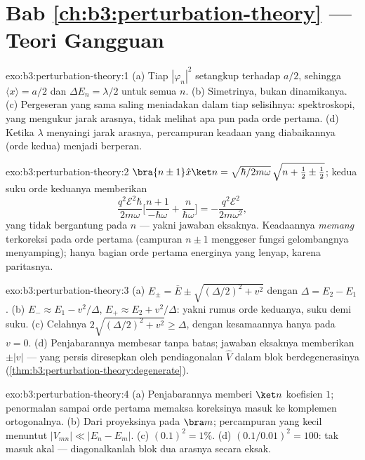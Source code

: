 \section*{Bab \ref{ch:b3:perturbation-theory} --- Teori Gangguan}

\begin{solution}{exo:b3:perturbation-theory:1}
(a) Tiap $|\varphi_n|^2$ setangkup terhadap $a/2$, sehingga $\langle
x\rangle = a/2$ dan $\Delta E_n = \lambda/2$ untuk semua $n$. (b)
Simetrinya, bukan dinamikanya. (c) Pergeseran yang sama saling
meniadakan dalam tiap selisihnya: spektroskopi, yang mengukur jarak
arasnya, tidak melihat apa pun pada orde pertama. (d) Ketika $\lambda$
menyaingi jarak arasnya, percampuran keadaan yang diabaikannya (orde
kedua) menjadi berperan.
\end{solution}

\begin{solution}{exo:b3:perturbation-theory:2}
$\bra{n\pm1}\hat x\ket n = \sqrt{\hbar/2m\omega}\,\sqrt{n + \tfrac12
\pm \tfrac12}$; kedua suku orde keduanya memberikan
\[
\frac{q^2\mathcal E^2\hbar}{2m\omega}\Big[\frac{n+1}{-\hbar\omega}
+ \frac{n}{\hbar\omega}\Big] = -\frac{q^2\mathcal E^2}{2m\omega^2} ,
\]
yang tidak bergantung pada $n$ --- yakni jawaban eksaknya. Keadaannya
\emph{memang} terkoreksi pada orde pertama (campuran $n \pm 1$
menggeser fungsi gelombangnya menyamping); hanya bagian orde pertama
energinya yang lenyap, karena paritasnya.
\end{solution}

\begin{solution}{exo:b3:perturbation-theory:3}
(a) $E_\pm = \bar E \pm \sqrt{(\Delta/2)^2 + v^2}$ dengan $\Delta =
E_2 - E_1$. (b) $E_- \approx E_1 - v^2/\Delta$, $E_+ \approx E_2 +
v^2/\Delta$: yakni rumus orde keduanya, suku demi suku. (c) Celahnya
$2\sqrt{(\Delta/2)^2 + v^2} \ge \Delta$, dengan kesamaannya hanya pada $v =
0$. (d) Penjabarannya membesar tanpa batas; jawaban eksaknya
memberikan $\pm|v|$ --- yang persis diresepkan oleh pendiagonalan
$\hat V$ dalam blok berdegenerasinya
(\cref{thm:b3:perturbation-theory:degenerate}).
\end{solution}

\begin{solution}{exo:b3:perturbation-theory:4}
(a) Penjabarannya memberi $\ket n$ koefisien $1$; penormalan sampai
orde pertama memaksa koreksinya masuk ke komplemen ortogonalnya. (b)
Dari proyeksinya pada $\bra m$; percampuran yang kecil menuntut
$|V_{mn}| \ll |E_n - E_m|$. (c) $(0.1)^2 = 1\%$. (d)
$(0.1/0.01)^2 = 100$: tak masuk akal --- diagonalkanlah blok dua
arasnya secara eksak.
\end{solution}


